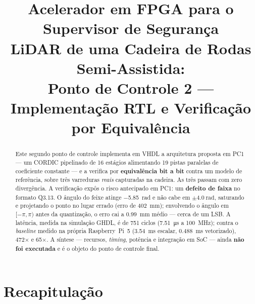\documentclass[conference]{IEEEtran}
\begin{document}
\title{Acelerador em FPGA para o Supervisor de Seguran\c{c}a\\
LiDAR de uma Cadeira de Rodas Semi-Assistida:\\
\large Ponto de Controle 2 --- Implementa\c{c}\~ao RTL e Verifica\c{c}\~ao por Equival\^encia}

\author{
\and
{}
}

\maketitle

\begin{abstract}
Este segundo ponto de controle implementa em VHDL a arquitetura proposta em PC1
--- um CORDIC pipelinado de \num{16} est\'agios alimentando \num{19} pistas
paralelas de coeficiente constante --- e a verifica por \textbf{equival\^encia bit
a bit} contra um modelo de refer\^encia, sobre tr\^es varreduras \emph{reais}
capturadas na cadeira. As tr\^es passam com zero diverg\^encia. A
verifica\c{c}\~ao exp\^os o risco antecipado em PC1: um \textbf{defeito de faixa}
no formato Q3.13. O \^angulo do feixe atinge \SI{-5.85}{\radian} e n\~ao cabe em
$\pm\SI{4.0}{\radian}$, saturando e projetando o ponto no lugar errado (erro de
\SI{402}{\milli\metre}); envolvendo o \^angulo em $[-\pi,\pi)$ antes da
quantiza\c{c}\~ao, o erro cai a \SI{0.99}{\milli\metre} m\'edio --- cerca de um
LSB. A lat\^encia, medida na simula\c{c}\~ao GHDL, \'e de \num{751} ciclos
(\SI{7.51}{\micro\second} a \SI{100}{\mega\hertz}); contra o \emph{baseline}
medido na pr\'opria Raspberry~Pi~5 (\SI{3.54}{\milli\second} escalar,
\SI{0.488}{\milli\second} vetorizado), \num{472}$\times$ e \num{65}$\times$. A
s\'intese --- recursos, \emph{timing}, pot\^encia e integra\c{c}\~ao em SoC ---
ainda \textbf{n\~ao foi executada} e \'e o objeto do ponto de controle final.
\end{abstract}

\section{Recapitula\c{c}\~ao}
\end{document}
